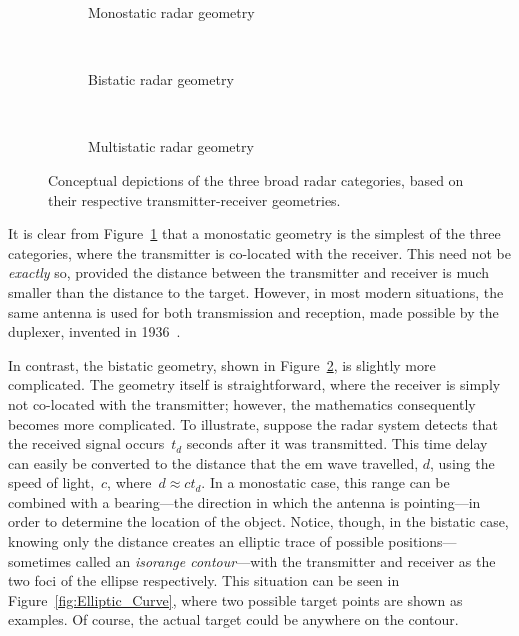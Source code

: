 \documentclass[class=report,11pt,crop=false]{standalone}
\begin{document}
\begin{figure}[htbp]
    \centering
    \captionsetup{type=figure}
    \begin{subfigure}[t]{0.43\textwidth}
        \centering
        \def\svgwidth{\linewidth}
        { %
            }
        \caption{Monostatic radar geometry}
        \label{fig:Geometry_Monostatic}
    \end{subfigure}%
    ~ 
    \begin{subfigure}[t]{0.43\textwidth}
        \centering
        \def\svgwidth{\linewidth}
        { %
            }
        \caption{Bistatic radar geometry}
        \label{fig:Geometry_Bistatic}
    \end{subfigure}
    ~
    \begin{subfigure}[t]{0.6\textwidth}
        \centering
        \def\svgwidth{\linewidth}
        { %
            }
        \caption{Multistatic radar geometry}
        \label{fig:Geometry_Multistatic}
    \end{subfigure}%
    \caption{Conceptual depictions of the three broad radar categories, based on their respective transmitter-receiver geometries.}
    \label{fig:Radar_Geometry_Depictions}
\end{figure}

It is clear from Figure~\ref{fig:Geometry_Monostatic} that a monostatic geometry is the simplest of the three categories, where the transmitter is co-located with the receiver. This need not be \emph{exactly} so, provided the distance between the transmitter and receiver is much smaller than the distance to the target. However, in most modern situations, the same antenna is used for both transmission and reception, made possible by the duplexer, invented in 1936~\cite{kuschel-hagan-history}.

In contrast, the bistatic geometry, shown in Figure~\ref{fig:Geometry_Bistatic}, is slightly more complicated. The geometry itself is straightforward, where the receiver is simply not co-located with the transmitter; however, the mathematics consequently becomes more complicated. To illustrate, suppose the radar system detects that the received signal occurs~\(t_d\) seconds after it was transmitted. This time delay can easily be converted to the distance that the \gls{em} wave travelled, \(d\), using the speed of light,~\(c\), where~\(d \approx ct_d\). In a monostatic case, this range can be combined with a bearing---the direction in which the antenna is pointing---in order to determine the location of the object. Notice, though, in the bistatic case, knowing only the distance creates an elliptic trace of possible positions---sometimes called an \emph{isorange contour}---with the transmitter and receiver as the two foci of the ellipse respectively. This situation can be seen in Figure~\ref{fig:Elliptic_Curve}, where two possible target points are shown as examples. Of course, the actual target could be anywhere on the contour.
\end{document}
